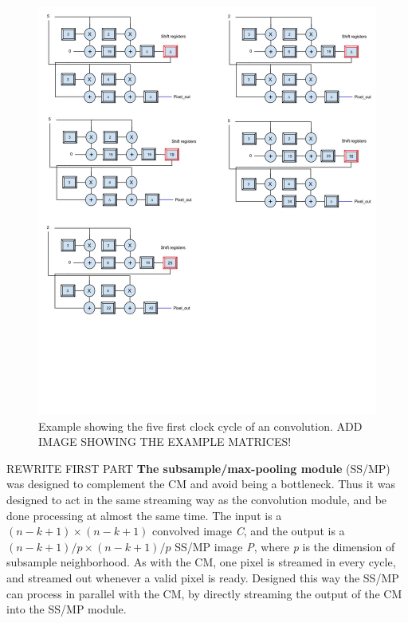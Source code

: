 \begin{figure}[h!]
  \centering
      \includegraphics[width=1.0\textwidth]{Figures/Method/Conv_example}
  \caption{Example showing the five first clock cycle of an convolution. ADD IMAGE SHOWING THE EXAMPLE MATRICES!}
\end{figure}

\vspace*{1\baselineskip}
REWRITE FIRST PART
\textbf{The subsample/max-pooling module} (SS/MP) was designed to complement the CM and avoid being a bottleneck. Thus it was designed to act in the same streaming way as the convolution module, and be done processing at almost the same time. The input is a $ (n-k+1) \times (n-k+1) $ convolved image \textit{C}, and the output is a $ (n-k+1)/p \times (n-k+1)/p $ SS/MP image \textit{P}, where \textit{p} is the dimension of subsample neighborhood. As with the CM, one pixel is streamed in every cycle, and streamed out whenever a valid pixel is ready. Designed this way the SS/MP can process in parallel with the CM, by directly streaming the output of the CM into the SS/MP module. 

